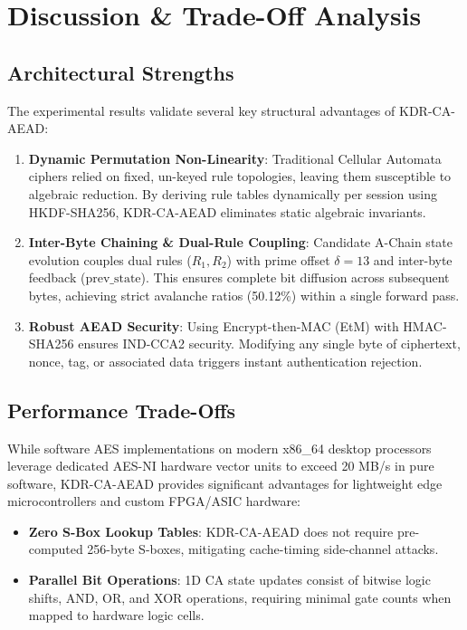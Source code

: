 \section{Discussion \& Trade-Off Analysis}
\label{sec:discussion}

\subsection{Architectural Strengths}
\label{subsec:strengths}
The experimental results validate several key structural advantages of KDR-CA-AEAD:
\begin{enumerate}
    \item \textbf{Dynamic Permutation Non-Linearity}: Traditional Cellular Automata ciphers relied on fixed, un-keyed rule topologies, leaving them susceptible to algebraic reduction. By deriving rule tables dynamically per session using HKDF-SHA256, KDR-CA-AEAD eliminates static algebraic invariants.
    \item \textbf{Inter-Byte Chaining & Dual-Rule Coupling}: Candidate A-Chain state evolution couples dual rules ($R_1, R_2$) with prime offset $\delta = 13$ and inter-byte feedback ($\text{prev\_state}$). This ensures complete bit diffusion across subsequent bytes, achieving strict avalanche ratios (50.12\%) within a single forward pass.
    \item \textbf{Robust AEAD Security}: Using Encrypt-then-MAC (EtM) with HMAC-SHA256 ensures IND-CCA2 security. Modifying any single byte of ciphertext, nonce, tag, or associated data triggers instant authentication rejection.
\end{enumerate}

\subsection{Performance Trade-Offs}
\label{subsec:tradeoffs}
While software AES implementations on modern x86_64 desktop processors leverage dedicated AES-NI hardware vector units to exceed 20 MB/s in pure software, KDR-CA-AEAD provides significant advantages for lightweight edge microcontrollers and custom FPGA/ASIC hardware:
\begin{itemize}
    \item \textbf{Zero S-Box Lookup Tables}: KDR-CA-AEAD does not require pre-computed 256-byte S-boxes, mitigating cache-timing side-channel attacks.
    \item \textbf{Parallel Bit Operations}: 1D CA state updates consist of bitwise logic shifts, AND, OR, and XOR operations, requiring minimal gate counts when mapped to hardware logic cells.
\end{itemize}

